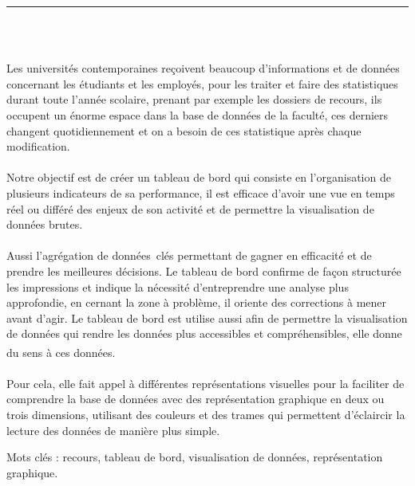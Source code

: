 \documentclass[12pt]{report}
\newenvironment{changemargin}[2]{%
\begin{list}{}{%
\setlength{\topsep}{0pt}%
\setlength{\leftmargin}{#1}%
\setlength{\rightmargin}{#2}%
\setlength{\listparindent}{\parindent}%
\setlength{\itemindent}{\parindent}%
\setlength{\parsep}{\parskip}%
}%
\item[]}{\end{list}}
\begin{document}
\begin{center}
    {\color{Blue} \rule{3in}{1.4mm} }\\
    \vspace{0.1in}
    \scshape{\fontsize{34}{46}{\bfseries{\color{Blue}{Résumé}}}}
    \\
    \vspace{0.6in}
\end{center}
\begin{changemargin}{0.9cm}{0.9cm}
Les universités contemporaines reçoivent beaucoup d’informations et de données concernant les étudiants et les employés, pour les traiter et faire des statistiques durant toute l’année scolaire, prenant par exemple les dossiers de recours, ils occupent un énorme espace dans la base de données de la faculté, ces derniers changent quotidiennement et on a besoin de ces statistique après chaque modification.
\\\\
Notre objectif est de créer un tableau de bord qui consiste en l'organisation de plusieurs indicateurs de sa performance, il est efficace d’avoir une vue en temps réel ou différé des enjeux de son activité et de permettre la visualisation de données brutes.
\\\\
  Aussi l’agrégation de données clés permettant de gagner en efficacité et de prendre les meilleures décisions. Le tableau de bord confirme de façon structurée les impressions et  indique la nécessité d’entreprendre une analyse plus approfondie, en cernant la zone à problème, il oriente des corrections à mener avant d’agir. Le tableau de bord est utilise aussi afin de permettre la visualisation de données qui rendre les données plus accessibles et compréhensibles, elle donne du sens à ces données.\textsuperscript{\cite{few2006information}}
\\\\
Pour cela, elle fait appel à différentes représentations visuelles pour la faciliter de comprendre la base de données avec des représentation graphique en deux ou trois dimensions, utilisant des couleurs et des trames qui permettent d'éclaircir la lecture des données de manière plus simple.
\end{changemargin}

\vspace{1in}

\begin{changemargin}{0.9cm}{0.9cm}
Mots clés : recours, tableau de bord, visualisation de données, représentation graphique.
\end{changemargin}
\end{document}
